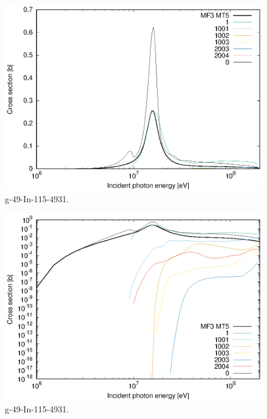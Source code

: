 \begin{figure}
 \includegraphics[width=\linewidth]{eps/g_49-In-115_4931.eps}
  \caption{g-49-In-115-4931.}
\end{figure}
\begin{figure}
 \includegraphics[width=\linewidth]{eps-log/g_49-In-115_4931.eps}
 \caption{g-49-In-115-4931.}
\end{figure}
\newpage \clearpage

